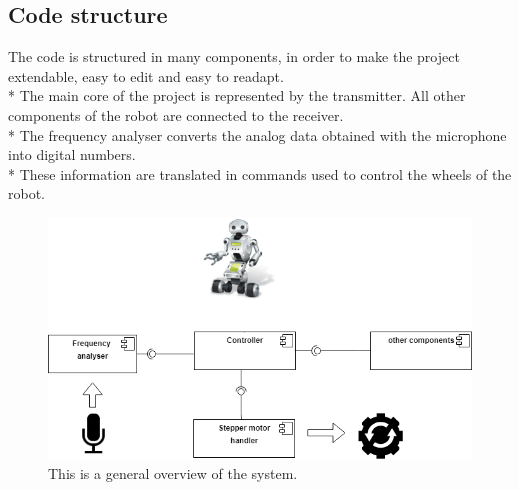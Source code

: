 \subsection{Code structure}
The code is structured in many components, in order to make the project extendable, easy to edit and easy to readapt.\\*
The main core of the project is represented by the transmitter. All other components of the robot are connected to the receiver.\\*
The frequency analyser converts the analog data obtained with the microphone into digital numbers.\\*
These information are translated in commands used to control the wheels of the robot.

\newpage
\begin{figure}[h!]
	\hspace*{-0.15 \textwidth}\includegraphics[width= 1.3\textwidth]
	{files/images/SystemStructure}
	\caption{This is a general overview of the system.}
\end{figure}